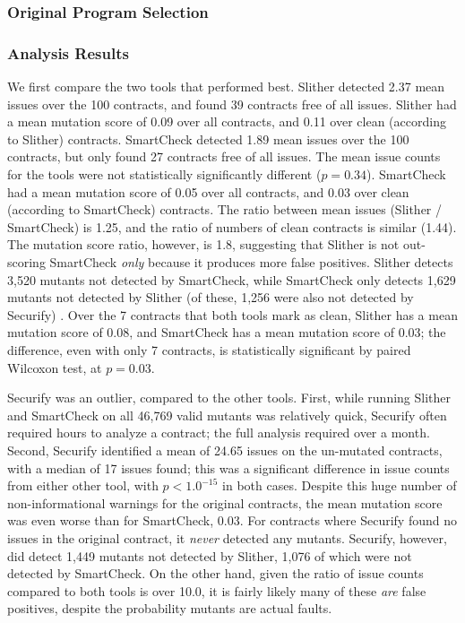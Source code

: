 \subsubsection{Original Program Selection}

\subsubsection{Analysis Results}

We first compare the two tools that performed best.  Slither detected 2.37 mean issues over the 100 contracts, and found 39 contracts free of all issues.  Slither had a mean mutation score of 0.09 over all contracts, and 0.11 over clean (according to Slither) contracts.  SmartCheck detected 1.89 mean issues over the 100 contracts, but only found 27 contracts free of all issues.  The mean issue counts for the tools were not statistically significantly different ($p=0.34$).  SmartCheck had a mean mutation score of 0.05 over all contracts, and 0.03 over clean (according to SmartCheck) contracts.  The ratio between mean issues (Slither / SmartCheck) is 1.25, and the ratio of numbers of clean contracts is similar (1.44).  The mutation score ratio, however, is 1.8, suggesting that Slither is not out-scoring SmartCheck \emph{only} because it produces more false positives.  Slither detects 3,520 mutants not detected by SmartCheck, while SmartCheck only detects 1,629 mutants not detected by Slither (of these, 1,256 were also not detected by Securify) .  Over the 7 contracts that both tools mark as clean, Slither has a mean mutation score of 0.08, and SmartCheck has a mean mutation score of 0.03; the difference, even with only 7 contracts, is statistically significant by paired Wilcoxon test, at $p=0.03$.

Securify was an outlier, compared to the other tools.  First, while running Slither and SmartCheck on all 46,769 valid mutants was relatively quick, Securify often required hours to analyze a contract; the full analysis required over a month.  Second, Securify identified a mean of 24.65 issues on the un-mutated contracts, with a median of 17 issues found; this was a significant difference in issue counts from either other tool, with $p<1.0^{-15}$ in both cases.  Despite this huge number of non-informational warnings for the original contracts, the mean mutation score was even worse than for SmartCheck, 0.03.  For contracts where Securify found no issues in the original contract, it \emph{never} detected any mutants. Securify, however, did detect 1,449 mutants not detected by Slither, 1,076 of which were not detected by SmartCheck.  On the other hand, given the ratio of issue counts compared to both tools is over 10.0, it is fairly likely many of these \emph{are} false positives, despite the probability mutants are actual faults.

